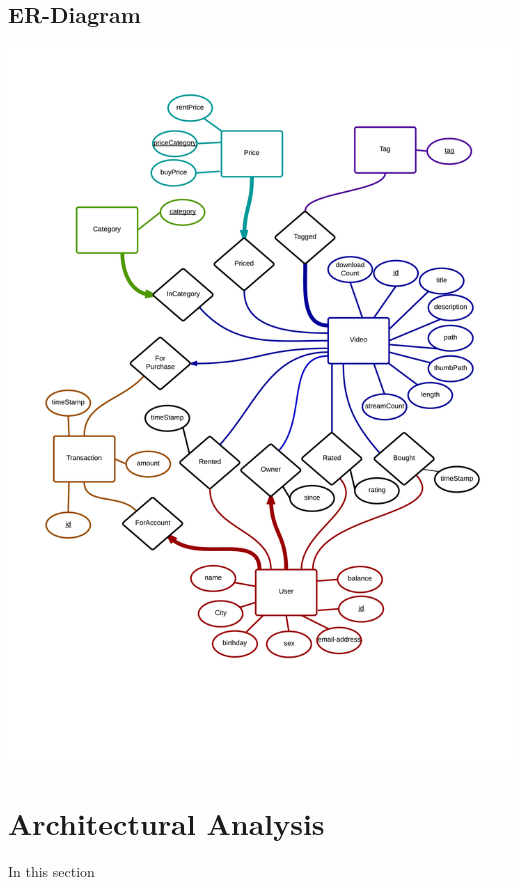 \subsection{ER-Diagram}
\begin{center}
\includegraphics[scale=0.15]{ERDiagram.png}
\end{center}

\section{Architectural Analysis}
In this section
